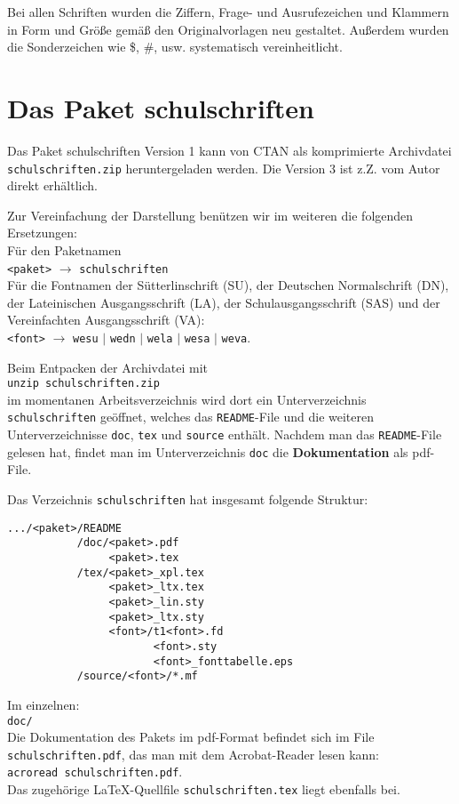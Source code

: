 \documentclass[12pt,titlepage]{article}
\begin{document}
Bei allen Schriften wurden die Ziffern, Frage- und Ausrufezeichen und
Klammern in Form und Gr\"o\ss{}e gem\"a\ss{} den Originalvorlagen
neu gestaltet. Au\ss{}erdem wurden die  Sonderzeichen wie \$, \#, usw. 
systematisch vereinheitlicht.

\section{Das Paket {\sffamily schulschriften}}
Das Paket {\sffamily schulschriften} Version 1 kann von CTAN \cite{11} 
als komprimierte
Archivdatei \verb+schulschriften.zip+ heruntergeladen werden.
Die Version 3 ist z.Z. vom Autor direkt erh\"altlich.

Zur Vereinfachung der Darstellung ben\"utzen wir im weiteren die
folgenden Ersetzungen:\\
F\"ur den Paketnamen\\
\verb+<paket>+  $\longrightarrow$  \verb+schulschriften+\\
F\"ur die Fontnamen der S\"utterlinschrift (SU), der Deutschen
Normalschrift (DN), der Lateinischen Ausgangsschrift (LA), der
Schulausgangsschrift (SAS) und der Vereinfachten Ausgangsschrift (VA):\\
\verb+<font>+  $\longrightarrow$ \verb+wesu+ $|$ \verb+wedn+ $|$
\verb+wela+ $|$ \verb+wesa+ $|$ \verb+weva+.

Beim Entpacken der Archivdatei mit\\
\verb+unzip schulschriften.zip+ \\
im momentanen Arbeitsverzeichnis wird dort ein Unterverzeichnis
\verb+schulschriften+ ge\"offnet, welches das \verb+README+-File und die
weiteren 
Unterverzeichnisse \verb+doc+, \verb+tex+ und \verb+source+
enth\"alt. 
Nachdem man das \verb+README+-File gelesen hat, findet man im Unterverzeichnis
\verb+doc+ die  {\bfseries Dokumentation} als pdf-File.

Das Verzeichnis \verb+schulschriften+ hat insgesamt folgende Struktur:
\begin{verbatim}
.../<paket>/README
           /doc/<paket>.pdf
                <paket>.tex
           /tex/<paket>_xpl.tex
                <paket>_ltx.tex
                <paket>_lin.sty
                <paket>_ltx.sty
                <font>/t1<font>.fd
                       <font>.sty
                       <font>_fonttabelle.eps 
           /source/<font>/*.mf
\end{verbatim}


Im einzelnen:\\
\verb+doc/+\\
Die Dokumentation des Pakets im pdf-Format  befindet sich im File
\verb+schulschriften.pdf+, das man mit dem Acrobat-Reader lesen kann:\\
\verb+acroread schulschriften.pdf+.\\
Das
zugeh\"orige \LaTeX-Quellfile \verb+schulschriften.tex+ liegt
ebenfalls bei.
\end{document}
